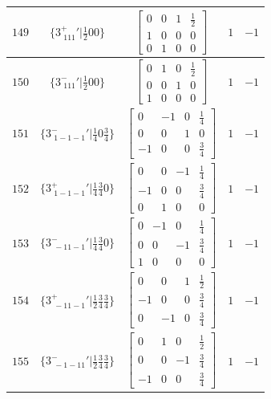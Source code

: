 \documentclass[fleqn,8pt]{jsarticle}
\begin{document}
\begin{longtable}{ccccc}
$ 149 $ & $ \{3^{+}_{\,\,111}{}'|\frac{1}{2} 0 0\} $ & $ \begin{bmatrix} 0 & 0 & 1 & \frac{1}{2} \\ 1 & 0 & 0 & 0 \\ 0 & 1 & 0 & 0 \end{bmatrix} $ & $ 1 $ & $ -1 $ \\ \hline
$ 150 $ & $ \{3^{-}_{\,\,111}{}'|\frac{1}{2} 0 0\} $ & $ \begin{bmatrix} 0 & 1 & 0 & \frac{1}{2} \\ 0 & 0 & 1 & 0 \\ 1 & 0 & 0 & 0 \end{bmatrix} $ & $ 1 $ & $ -1 $ \\ \hline
$ 151 $ & $ \{3^{-}_{\,\,1-1-1}{}'|\frac{1}{4} 0 \frac{3}{4}\} $ & $ \begin{bmatrix} 0 & -1 & 0 & \frac{1}{4} \\ 0 & 0 & 1 & 0 \\ -1 & 0 & 0 & \frac{3}{4} \end{bmatrix} $ & $ 1 $ & $ -1 $ \\ \hline
$ 152 $ & $ \{3^{+}_{\,\,1-1-1}{}'|\frac{1}{4} \frac{3}{4} 0\} $ & $ \begin{bmatrix} 0 & 0 & -1 & \frac{1}{4} \\ -1 & 0 & 0 & \frac{3}{4} \\ 0 & 1 & 0 & 0 \end{bmatrix} $ & $ 1 $ & $ -1 $ \\ \hline
$ 153 $ & $ \{3^{-}_{\,\,-11-1}{}'|\frac{1}{4} \frac{3}{4} 0\} $ & $ \begin{bmatrix} 0 & -1 & 0 & \frac{1}{4} \\ 0 & 0 & -1 & \frac{3}{4} \\ 1 & 0 & 0 & 0 \end{bmatrix} $ & $ 1 $ & $ -1 $ \\ \hline
$ 154 $ & $ \{3^{+}_{\,\,-11-1}{}'|\frac{1}{2} \frac{3}{4} \frac{3}{4}\} $ & $ \begin{bmatrix} 0 & 0 & 1 & \frac{1}{2} \\ -1 & 0 & 0 & \frac{3}{4} \\ 0 & -1 & 0 & \frac{3}{4} \end{bmatrix} $ & $ 1 $ & $ -1 $ \\ \hline
$ 155 $ & $ \{3^{-}_{\,\,-1-11}{}'|\frac{1}{2} \frac{3}{4} \frac{3}{4}\} $ & $ \begin{bmatrix} 0 & 1 & 0 & \frac{1}{2} \\ 0 & 0 & -1 & \frac{3}{4} \\ -1 & 0 & 0 & \frac{3}{4} \end{bmatrix} $ & $ 1 $ & $ -1 $ \\ \hline

\end{longtable}
\end{document}
